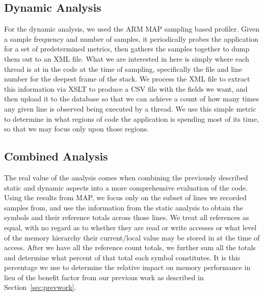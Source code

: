 \subsection{Dynamic Analysis}
For the dynamic analysis, we used the ARM MAP sampling based profiler.
Given a sample frequency and number of samples, it periodically probes the application for a set of predetermined metrics, then gathers the samples together to dump them out to an \acs{XML} file.
What we are interested in here is simply where each thread is at in the code at the time of sampling, specifically the file and line number for the deepest frame of the stack.
We process the \acs{XML} file to extract this information via \ac{XSLT} to produce a \acs{CSV} file with the fields we want, and then upload it to the database so that we can achieve a count of how many times any given line is observed being executed by a thread.
We use this simple metric to determine in what regions of code the application is spending most of its time, so that we may focus only upon those regions.
\subsection{Combined Analysis}
The real value of the analysis comes when combining the previously described static and dynamic aspects into a more comprehensive evaluation of the code.
Using the results from MAP, we focus only on the subset of lines we recorded samples from, and use the information from the static analysis to obtain the symbols and their reference totals across those lines.
We treat all references as equal, with no regard as to whether they are read or write accesses or what level of the memory hierarchy their current/local value may be stored in at the time of access.
After we have all the reference count totals, we further sum all the totals and determine what percent of that total each symbol constitutes.
It is this percentage we use to determine the relative impact on memory performance in lieu of the benefit factor from our previous work as described in Section~\ref{sec:prevwork}.
